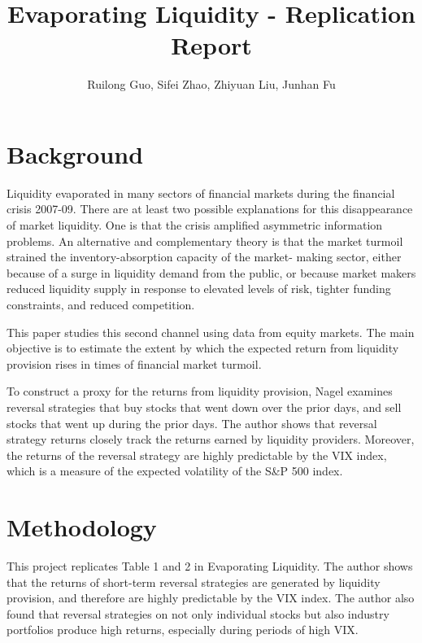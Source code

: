 \documentclass[11pt]{article}
\begin{document}
\title{Evaporating Liquidity - Replication Report}

\author{
    Ruilong Guo,
    Sifei Zhao,
    Zhiyuan Liu,
    Junhan Fu
}


\maketitle

\section{Background}
Liquidity evaporated in many sectors of financial markets during the financial crisis 2007-09.
There are at least two possible explanations for this disappearance of market liquidity. One is that the crisis amplified asymmetric information problems.
An alternative and complementary theory is that the market turmoil strained the inventory-absorption capacity of the market- making sector, 
either because of a surge in liquidity demand from the public, or because market makers reduced 
liquidity supply in response to elevated levels of risk, tighter funding constraints, and reduced competition.

This paper studies this second channel using data from equity markets. 
The main objective is to estimate the extent by which the expected return from liquidity provision rises in times of financial market turmoil.

To construct a proxy for the returns from liquidity provision, Nagel examines reversal strategies that buy stocks that went down over the prior days,
 and sell stocks that went up during the prior days. The author shows that reversal strategy returns closely track the returns earned by liquidity providers.
 Moreover, the returns of the reversal strategy are highly predictable by the VIX index, which is a measure of the expected volatility of the S\&P 500 index.


\section{Methodology}
This project replicates Table 1 and 2 in Evaporating Liquidity\cite{nagel}. The author
shows that the returns of short-term reversal strategies are generated by liquidity 
provision, and therefore are highly predictable by the VIX index. The author also 
found that reversal strategies on not only individual stocks but also industry portfolios 
produce high returns, especially during periods of high VIX.
\end{document}
